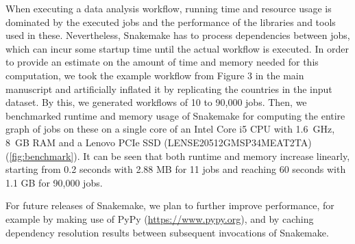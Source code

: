 \documentclass[10pt,a4paper,twocolumn]{article}
\let\plainurl\url
\renewcommand{\url}[1]{\protect\plainurl{#1}}
\begin{document}
When executing a data analysis workflow, running time and resource usage is dominated by the executed jobs and the performance of the libraries and tools used in these.
Nevertheless, Snakemake has to process dependencies between jobs, which can incur some startup time until the actual workflow is executed.
In order to provide an estimate on the amount of time and memory needed for this computation, we took the example workflow from Figure 3 in the main manuscript and artificially inflated it by replicating the countries in the input dataset.
By this, we generated workflows of 10 to 90,000 jobs.
Then, we benchmarked runtime and memory usage of Snakemake for computing the entire graph of jobs on these on a single core of an Intel Core i5 CPU with 1.6~GHz, 8~GB RAM and a Lenovo PCIe SSD (LENSE20512GMSP34MEAT2TA) (\autoref{fig:benchmark}).
It can be seen that both runtime and memory increase linearly, starting from 0.2 seconds with 2.88 MB for 11 jobs and reaching 60 seconds with 1.1 GB for 90,000 jobs.

For future releases of Snakemake, we plan to further improve performance, for example by making use of PyPy (\url{https://www.pypy.org}), and by caching dependency resolution results between subsequent invocations of Snakemake.


\printbibliography
\end{document}
